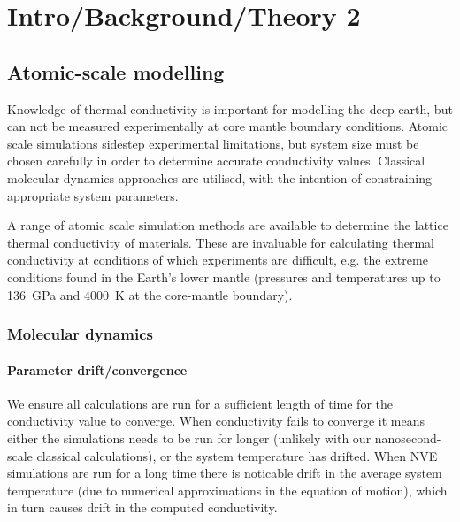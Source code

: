 \chapter{Intro/Background/Theory 2} 

\label{Chapter2} 



\section{Atomic-scale modelling}
Knowledge of thermal conductivity is important for modelling the deep earth, but can not be measured experimentally at core mantle boundary conditions. Atomic scale simulations sidestep experimental limitations, but system size must be chosen carefully in order to determine accurate conductivity values. Classical molecular dynamics approaches are utilised, with the intention of constraining appropriate system parameters.

A range of atomic scale simulation methods are available to determine the lattice thermal conductivity of materials. These are invaluable for calculating thermal conductivity at conditions of which experiments are difficult, e.g. the extreme conditions found in the Earth's lower mantle (pressures and temperatures up to 136~GPa and 4000~K at the core-mantle boundary). 

\subsection{Molecular dynamics}

\subsubsection{Parameter drift/convergence}
We ensure all calculations are run for a sufficient length of time for the conductivity value to converge. When conductivity fails to converge it means either the simulations needs to be run for longer (unlikely with our nanosecond-scale classical calculations), or the system temperature has drifted. When NVE simulations are run for a long time there is noticable drift in the average system temperature (due to numerical approximations in the equation of motion), which in turn causes drift in the computed conductivity.

